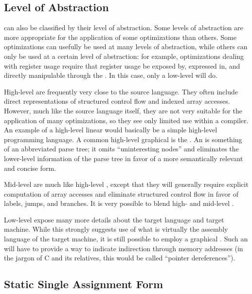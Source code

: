 \subsection{Level of Abstraction}
\IRs can also be classified by their level of abstraction. Some levels of abstraction are more appropriate for the application of some optimizations than others. Some optimizations can usefully be used at many levels of abstraction, while others can only be used at a certain level of abstraction: for example, optimizations dealing with register usage require that register usage be exposed by, expressed in, and directly manipulable through the \IR{}. In this case, only a low-level \IR will do.

High-level \IRs are frequently very close to the source language. They often include direct representations of structured control flow and indexed array accesses. However, much like the source language itself, they are not very suitable for the application of many optimizations, so they see only limited use within a compiler. An example of a high-level linear \IR would basically be a simple high-level programming language. A common high-level graphical \IR is the . An \AST is something of an abbreviated parse tree; it omits ``uninteresting nodes'' and eliminates the lower-level information of the parse tree in favor of a more semantically relevant and concise form.%

Mid-level \IRs are much like high-level \IRs{}, except that they will generally require explicit computation of array accesses and eliminate structured control flow in favor of labels, jumps, and branches. It is very possible to blend high- and mid-level \IRs{}.

Low-level \IRs expose many more details about the target language and target machine. While this strongly suggests use of what is virtually the assembly language of the target machine, it is still possible to employ a graphical \IR{}. Such an \IR will have to provide a way to indicate indirection through memory addresses (in the jargon of C and its relatives, this would be called ``pointer dereferences'').

\subsection{Static Single Assignment Form}

